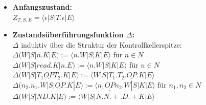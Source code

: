\documentclass[ngerman,a4paper]{report}
\begin{document}
\begin{itemize}
	\item \textbf{Anfangszustand:}\\
		$Z_{T,S,E} = \langle\epsilon|S|T.\epsilon|E\rangle$\\
	\item \textbf{Zustandsüberführungsfunktion $\Delta$:}\\
		$\Delta$ induktiv über die Struktur der Kontrollkellerspitze:\\

		$\Delta (W|S|n.K|E) := \langle n.W|S¦K¦E\rangle$ für $n \in N$\\
		$\Delta (W|S|\underline{read}.K|n.E) := \langle n.W|S|K|E\rangle$ für $n \in N$\\
		$\Delta (W|S|T_1 \underline{OP} T_2.K|E) := \langle W|S|T_1.T_2.\underline{OP}.K|E\rangle$\\
		$\Delta (n_2.n_1.W|S|\underline{OP}.K|E) := \langle \underline{n_1\underline{OP}n_2}.W|S|K|E\rangle$ für $n_1,n_2 \in N$\\

		$\Delta (W|S|ND.K|E) := \langle W|S|N.N.+.D.+K|E\rangle$%

\end{itemize}
\end{document}
